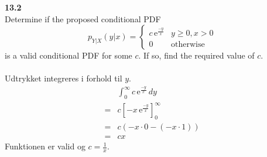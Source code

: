 \documentclass[12pt,a4paper]{report}
\begin{document}
\textbf{13.2}\\
Determine if the proposed conditional PDF
\begin{equation}
p_{Y|X}(y|x)=\begin{cases}c\,\mathrm{e}^{\frac{-y}{x}}&y\geq0,x>0\\
0&\text{otherwise}\end{cases}
\end{equation}
is a valid conditional PDF for some $c$. If so, find the required value of $c$.\\\\
Udtrykket integreres i forhold til $y$.
\begin{align*}
&\int_0^{\infty}\!c\,\mathrm{e}^{\frac{-y}{x}}\,dy\\
=&c\left[-x\,\mathrm{e}^{\frac{-y}{x}}\right]_0^{\infty}\\
=&c\left(-x\cdot0-(-x\cdot1)\right)\\
=&cx
\end{align*}
Funktionen er valid og $c=\frac{1}{x}$.
\end{document}
